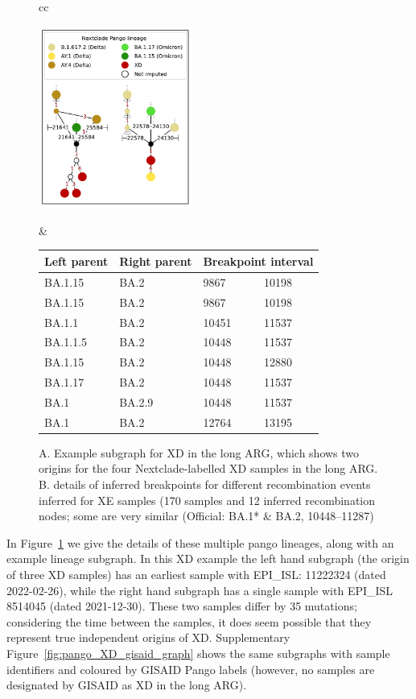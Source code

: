 \documentclass{article}
\begin{document}
\begin{figure}
\begin{tabular}{cc}

\includegraphics[width=0.45\textwidth]{figures/Pango_XD_nxcld_tight_graph.pdf}

 &

\begin{tabular}{llll}
\toprule
Left parent & Right parent & \multicolumn{2}{l}{Breakpoint interval}\\
\midrule
BA.1.15 & BA.2  &9867  &10198\\
BA.1.15 & BA.2  &9867  &10198\\
BA.1.1  &BA.2  &10451  &11537\\
BA.1.1.5 & BA.2 &10448 & 11537\\
BA.1.15 & BA.2  &10448  &12880\\
BA.1.17 & BA.2  &10448 & 11537\\
BA.1  &BA.2.9  &10448 & 11537\\
BA.1  &BA.2  &12764  &13195\\
\bottomrule
\end{tabular}
\end{tabular}
\caption{\label{fig:multiple_origins_graph} A. Example subgraph for XD in the long ARG, which shows two origins for the four Nextclade-labelled XD samples in the long ARG. B. details of inferred breakpoints for different recombination events inferred for XE samples (170 samples and 12 inferred recombination nodes; some are very similar (Official: BA.1* \& BA.2, 10448–11287)}
\end{figure}

In Figure~\ref{fig:multiple_origins_graph} we give the details of these multiple pango lineages, along with an example lineage subgraph. In this XD example the left hand subgraph (the origin of three XD samples) has an earliest sample with EPI\_ISL: 11222324 (dated 2022-02-26), while the right hand subgraph has a single sample with EPI\_ISL 8514045 (dated 2021-12-30). These two samples differ by 35 mutations; considering the time between the samples, it does seem possible that they represent true independent origins of XD. Supplementary Figure~\ref{fig:pango_XD_gisaid_graph} shows the same subgraphs with sample identifiers and coloured by GISAID Pango labels (however, no samples are designated by GISAID as XD in the long ARG).
\end{document}
